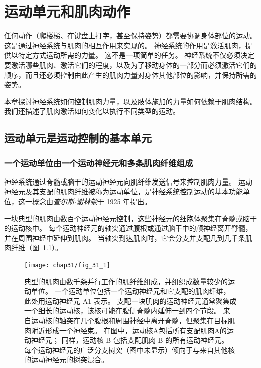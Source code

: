 \chapter{运动单元和肌肉动作} \label{chap:chap31}

任何动作（爬楼梯、在键盘上打字，甚至保持姿势）都需要协调身体部位的运动。
这是通过神经系统与肌肉的相互作用来实现的。
神经系统的作用是激活肌肉，提供以特定方式运动所需的力量。
这不是一项简单的任务。
神经系统不仅必须决定要激活哪些肌肉、激活它们的程度，以及为了移动身体的一部分而必须激活它们的顺序，而且还必须控制由此产生的肌肉力量对身体其他部位的影响，并保持所需的姿势。


本章探讨神经系统如何控制肌肉力量，以及肢体施加的力量如何依赖于肌肉结构。
我们还描述了肌肉激活如何变化以执行不同类型的运动。



\section{运动单元是运动控制的基本单元}

\subsection{一个运动单位由一个运动神经元和多条肌肉纤维组成}

神经系统通过脊髓或脑干的运动神经元向肌纤维发送信号来控制肌肉力量。
运动神经元及其支配的肌肉纤维被称为运动单位，是神经系统控制运动的基本功能单位，这一概念由\textit{查尔斯$\cdot$谢林顿}于 1925 年提出。


一块典型的肌肉由数百个运动神经元控制，这些神经元的细胞体聚集在脊髓或脑干的运动核中。
每个运动神经元的轴突通过腹根或通过脑干中的颅神经离开脊髓，并在周围神经中延伸到肌肉。
当轴突到达肌肉时，它会分支并支配几到几千条肌肉纤维（图~\ref{fig:31_1}）。


\begin{figure}[htbp]
	\centering
	\texttt{[image: chap31/fig\_31\_1]}
	\caption{典型的肌肉由数千条并行工作的肌纤维组成，并组织成数量较少的运动单位。
		一个运动单位包括一个运动神经元和它支配的肌肉纤维，此处用运动神经元 A1 表示。
		支配一块肌肉的运动神经元通常聚集成一个细长的运动核，该核可能在腹侧脊髓内延伸一到四个节段。
		来自运动核的轴突在几个腹根和周围神经中离开脊髓，但聚集在目标肌肉附近形成一个神经束。
		在图中，运动核A包括所有支配肌肉A的运动神经元；
		同样，运动核 B 包括支配肌肉 B 的所有运动神经元。
		每个运动神经元的广泛分支树突（图中未显示）倾向于与来自其他核的运动神经元的树突混合。}
	\label{fig:31_1}
\end{figure}



